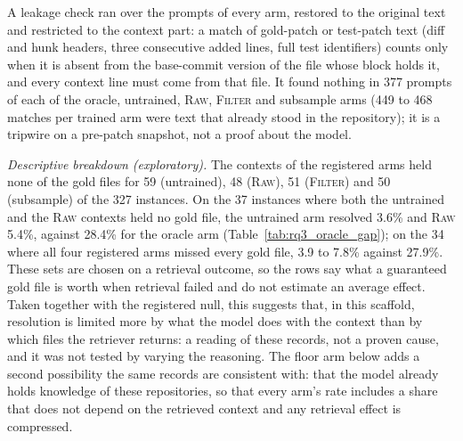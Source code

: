 \documentclass[10pt,twocolumn]{article}
\begin{document}
A leakage check ran over the prompts of every arm, restored to the original text and restricted to the context part: a match of gold-patch or test-patch text (diff and hunk headers, three consecutive added lines, full test identifiers) counts only when it is absent from the base-commit version of the file whose block holds it, and every context line must come from that file. It found nothing in 377 prompts of each of the oracle, untrained, \textsc{Raw}, \textsc{Filter} and subsample arms (449 to 468 matches per trained arm were text that already stood in the repository); it is a tripwire on a pre-patch snapshot, not a proof about the model. %

\emph{Descriptive breakdown (exploratory).} The contexts of the registered arms held none of the gold files for 59 (untrained), 48 (\textsc{Raw}), 51 (\textsc{Filter}) and 50 (subsample) of the 327 instances. %
On the 37 instances where both the untrained and the \textsc{Raw} contexts held no gold file, the untrained arm resolved 3.6\% and \textsc{Raw} 5.4\%, against 28.4\% for the oracle arm (Table~\ref{tab:rq3_oracle_gap}); on the 34 where all four registered arms missed every gold file, 3.9 to 7.8\% against 27.9\%. %
These sets are chosen on a retrieval outcome, so the rows say what a guaranteed gold file is worth when retrieval failed and do not estimate an average effect. Taken together with the registered null, this suggests that, in this scaffold, resolution is limited more by what the model does with the context than by which files the retriever returns: a reading of these records, not a proven cause, and it was not tested by varying the reasoning. The floor arm below adds a second possibility the same records are consistent with: that the model already holds knowledge of these repositories, so that every arm's rate includes a share that does not depend on the retrieved context and any retrieval effect is compressed.


\end{document}
